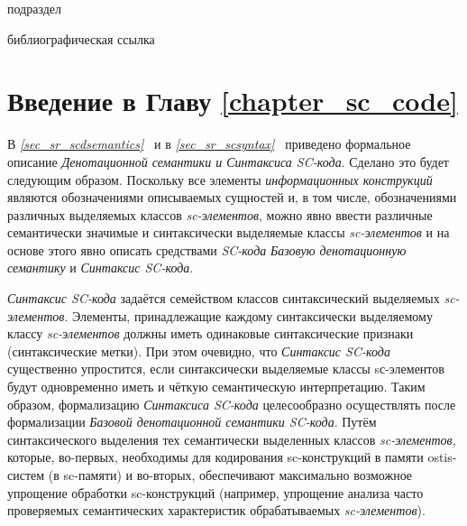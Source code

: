 
\begin{SCn}
	\begin{scnrelfromlist}{подраздел}
	\end{scnrelfromlist}
\end{SCn}

\bigskip

\begin{SCn}
\begin{scnrelfromlist}{библиографическая ссылка}
\end{scnrelfromlist}
\end{SCn}

\section*{Введение в Главу \ref{chapter_sc_code}}

В \textit{\ref{sec_sr_scdsemantics}~} и в \textit{\ref{sec_sr_scsyntax}~} приведено формальное описание \textit{Денотационной семантики и Синтаксиса SC-кода}. Сделано это будет следующим образом. Поскольку все элементы \textit{информационных конструкций} являются обозначениями описываемых сущностей и, в том числе, обозначениями различных выделяемых классов \textit{sc-элементов}, можно явно ввести различные семантически значимые и синтаксически выделяемые классы \textit{sc-элементов} и на основе этого явно описать средствами \textit{SC-кода} \textit{Базовую денотационную семантику} и \textit{Синтаксис SC-кода}.
 
\textit{Синтаксис SC-кода} задаётся семейством классов синтаксический выделяемых \textit{sc-элементов}. Элементы, принадлежащие каждому синтаксически выделяемому классу \textit{sc-элементов} должны иметь одинаковые синтаксические признаки (синтаксические метки). При этом очевидно, что \textit{Синтаксис SC-кода} существенно упростится, если синтаксически выделяемые классы sс-элементов будут одновременно иметь и чёткую семантическую интерпретацию. Таким образом, формализацию \textit{Синтаксиса SC-кода} целесообразно осуществлять после формализации \textit{Базовой денотационной семантики SC-кода}. Путём синтаксического выделения тех семантически выделенных классов \textit{sc-элементов}, которые, во-первых, необходимы для кодирования sc-конструкций в памяти ostis-систем (в sc-памяти) и во-вторых, обеспечивают максимально возможное упрощение обработки sc-конструкций (например, упрощение анализа часто проверяемых семантических характеристик обрабатываемых \textit{sc-элементов}).

